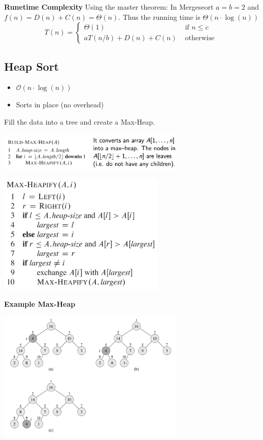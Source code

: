 \documentclass[10pt,a4paper,twocolumn]{article}
\newcommand\pro{\item[$+$]}
\newcommand\con{\item[$-$]}
\begin{document}
\textbf{Runetime Complexity}
Using the master theorem: In Mergeseort $a=b=2$ and $f(n)=D(n)+C(n)=\Theta(n)$. Thus the running time is $\Theta(n \cdot \log(n))$
$$
T(n)=\left\{\begin{array}{ll}\Theta(1) & \text { if } n \leq c \\ a T(n / b)+D(n)+C(n) & \text { otherwise }\end{array}\right.
$$


\subsection{Heap Sort}
\begin{itemize}
	\pro $\mathcal{O}(n \cdot \log(n))$
	\con Sorts in place (no overhead)
\end{itemize}

Fill the data into a tree and create a Max-Heap.

\begin{center}
	\includegraphics[width=9cm]{images/build-max-heap}
\end{center}

\begin{center}
	\includegraphics[width=8cm]{images/max-heapify}
\end{center}

\newpage
\textbf{Example Max-Heap}

\begin{center}
	\includegraphics[width=9cm]{images/max-heapify-example}
\end{center}
\end{document}
